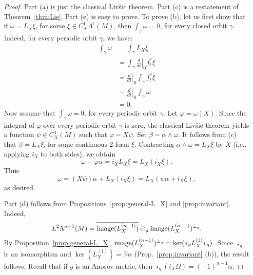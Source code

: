 \documentclass[11pt,letterpaper,reqno,abstract=true]{scrartcl}
\theoremstyle{plain}                              %
\theoremstyle{definition}                         %
\theoremstyle{remark}                             %
\newcommand{\R}{\mathbb{R}}                     %
\begin{document}
\begin{proof}
  Part (a) is just the classical Liv\v{s}ic theorem. Part (c) is a
  restatement of Theorem~\ref{thm:Lie}. Part (e) is easy to prove. To
  prove (b), let us first show that if $\omega = L_X \xi$, for some
  $\xi \in C^1_X \Lambda^1(M)$, then $\int_\gamma \omega = 0$, for
  every closed orbit $\gamma$. Indeed, for every periodic orbit
  $\gamma$, we have:
  \begin{align*}
    \int_\gamma \omega & = \int_\gamma L_X \xi \\
                       & = \int_\gamma \left. \frac{d}{dt} \right|_0 f_t^\ast \xi \\
                       & = \left. \frac{d}{dt} \right|_0 \int_\gamma f_t^\ast \xi \\
                       & = \left. \frac{d}{dt} \right|_0 \int_\gamma \omega \\
    & = 0.
  \end{align*}
  Now assume that $\int_\gamma \omega = 0$, for every periodic orbit
  $\gamma$. Let $\varphi = \omega(X)$. Since the integral of $\varphi$
  over every periodic orbit $\gamma$ is zero, the classical Liv\v{s}ic
  theorem yields a function $\psi \in C^1_X(M)$ such that
  $\varphi = X\psi$. Set $\beta = \alpha \wedge \omega$. It follows
  from (c) that $\beta = L_X \xi$, for some continuous 2-form
  $\xi$. Contracting $\alpha \wedge \omega = L_X \xi$ by $X$ (i.e.,
  applying $i_X$ to both sides), we obtain
  \begin{displaymath}
    \omega - \varphi \alpha = i_X L_X \xi = L_X (i_X \xi).
  \end{displaymath}
  Thus
  \begin{displaymath}
    \omega = (X \psi) \alpha + L_X (i_X \xi) = L_X (\psi \alpha + i_X \xi),
  \end{displaymath}
  as desired.

  Part (d) follows from Propositions~\ref{prop:general-L_X} and
  \ref{prop:invariant}. Indeed,
  \begin{displaymath}
    L^2 \Lambda^{n-1}(M) = \overline{\text{image}(\normalfont
      L_X^{(n-1)})} \oplus_g \text{image}(\normalfont
      L_X^{(n-1)})^{\perp_g}.
  \end{displaymath}
  By Proposition~\ref{prop:general-L_X},
  $\text{image}(\normalfont L_X^{(n-1)})^{\perp_g} = \ker(\ast_g
  L_X^{(1)} \ast_g)$. Since $\star_g$ is an isomorphism and
  $\ker(L_X^{(1)}) = \R \alpha$ (Prop.~\ref{prop:invariant} (b)), the result follows. Recall that if
  $g$ is an Anosov metric, then
  $\star_g (i_X \Omega) = (-1)^{n-1} \alpha$.
\end{proof}
\end{document}
